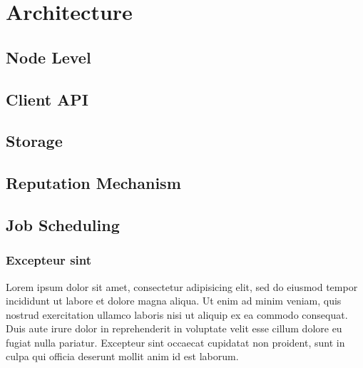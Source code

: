 % 
% 

\section{Architecture}

\subsection{Node Level}

\subsection{Client API}

\subsection{Storage}

\subsection{Reputation Mechanism}

\subsection{Job Scheduling}


\subsubsection{Excepteur sint}

Lorem ipsum dolor sit amet, consectetur adipisicing elit, sed do eiusmod
tempor incididunt ut labore et dolore magna aliqua. Ut enim ad minim veniam,
quis nostrud exercitation ullamco laboris nisi ut aliquip ex ea commodo
consequat. Duis aute irure dolor in reprehenderit in voluptate velit esse
cillum dolore eu fugiat nulla pariatur. Excepteur sint occaecat cupidatat non
proident, sunt in culpa qui officia deserunt mollit anim id est laborum.